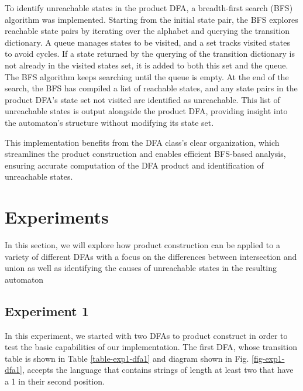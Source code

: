 \documentclass[conference]{IEEEtran}
\begin{document}
To identify unreachable states in the product DFA, a breadth-first search (BFS) algorithm was implemented. Starting from the initial state pair, the BFS explores reachable state pairs by iterating over the alphabet and querying the transition dictionary. A queue manages states to be visited, and a set tracks visited states to avoid cycles. If a state returned by the querying of the transition dictionary is not already in the visited states set, it is added to both this set and the queue. The BFS algorithm keeps searching until the queue is empty. At the end of the search, the BFS has compiled a list of reachable states, and any state pairs in the product DFA's state set not visited are identified as unreachable. This list of unreachable states is output alongside the product DFA, providing insight into the automaton's structure without modifying its state set.

This implementation benefits from the DFA class's clear organization, which streamlines the product construction and enables efficient BFS-based analysis, ensuring accurate computation of the DFA product and identification of unreachable states.

\section{Experiments}
In this section, we will explore how product construction can be applied to a variety of different DFAs with a focus on the differences between intersection and union as well as identifying the causes of unreachable states in the resulting automaton

\subsection{Experiment 1}
In this experiment, we started with two DFAs to product construct in order to test the basic capabilities of our implementation. The first DFA, whose transition table is shown in Table \ref{table-exp1-dfa1} and diagram shown in Fig. \ref{fig-exp1-dfa1}, accepts the language that contains strings of length at least two that have a 1 in their second position.
\end{document}
